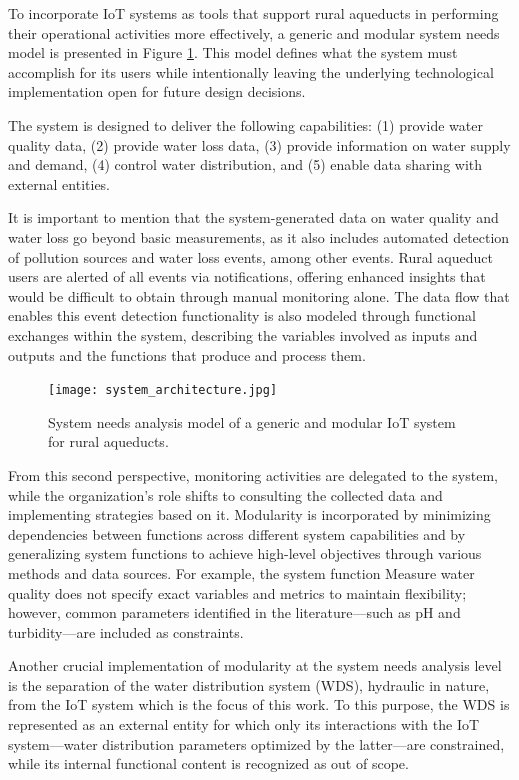 \documentclass[conference]{IEEEtran}
\begin{document}
To incorporate IoT systems as tools that support rural aqueducts in performing their operational activities more effectively, a generic and modular system needs model is presented in Figure \ref{fig:sab}. This model defines what the system must accomplish for its users while intentionally leaving the underlying technological implementation open for future design decisions.

The system is designed to deliver the following capabilities: (1) provide water quality data, (2) provide water loss data, (3) provide information on water supply and demand, (4) control water distribution, and (5) enable data sharing with external entities.

It is important to mention that the system-generated data on water quality and water loss go beyond basic measurements, as it also includes automated detection of pollution sources and water loss events, among other events.
Rural aqueduct users are alerted of all events via notifications, offering enhanced insights that would be difficult to obtain through manual monitoring alone.
The data flow that enables this event detection functionality is also modeled through functional exchanges within the system, describing the variables involved as inputs and outputs and the functions that produce and process them.

\begin{figure}[hbt]
    \centering
    \texttt{[image: system\_architecture.jpg]}
    \caption{System needs analysis model of a generic and modular IoT system for rural aqueducts.}
    \label{fig:sab}
\end{figure}

From this second perspective, monitoring activities are delegated to the system, while the organization’s role shifts to consulting the collected data and implementing strategies based on it. Modularity is incorporated by minimizing dependencies between functions across different system capabilities and by generalizing system functions to achieve high-level objectives through various methods and data sources. For example, the system function Measure water quality does not specify exact variables and metrics to maintain flexibility; however, common parameters identified in the literature—such as pH and turbidity—are included as constraints.

Another crucial implementation of modularity at the system needs analysis level is the separation of the water distribution system (WDS), hydraulic in nature, from the IoT system which is the focus of this work. To this purpose, the WDS is represented as an external entity for which only its interactions with the IoT system—water distribution parameters optimized by the latter—are constrained, while its internal functional content is recognized as out of scope.
\end{document}
